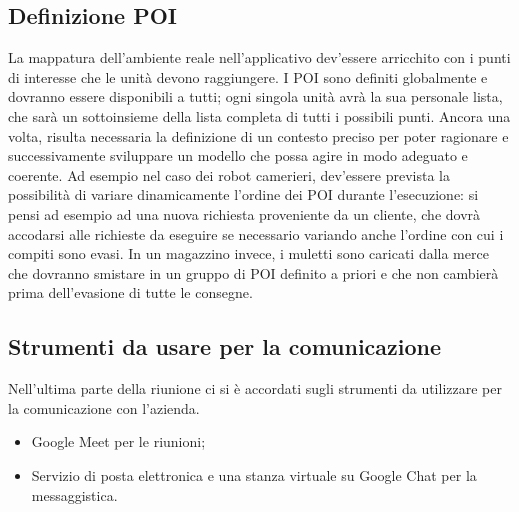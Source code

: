 \subsection{Definizione POI}
La mappatura dell'ambiente reale nell'applicativo dev'essere arricchito con i punti di interesse che le unità devono raggiungere. I POI sono definiti globalmente e dovranno essere disponibili a tutti; ogni singola unità avrà la sua personale lista, che sarà un sottoinsieme della lista completa di tutti i possibili punti.
Ancora una volta, risulta necessaria la definizione di un contesto preciso per poter ragionare e successivamente sviluppare un modello che possa agire in modo adeguato e coerente.
Ad esempio nel caso dei robot camerieri, dev'essere prevista la possibilità di variare dinamicamente l'ordine dei POI durante l'esecuzione: si pensi ad esempio ad una nuova richiesta proveniente da un cliente, che dovrà accodarsi alle richieste da eseguire se necessario variando anche l'ordine con cui i compiti sono evasi. 
In un magazzino invece, i muletti sono caricati dalla merce che dovranno smistare in un gruppo di POI definito a priori e che non cambierà prima dell'evasione di tutte le consegne.


\subsection{Strumenti da usare per la comunicazione}
Nell'ultima parte della riunione ci si è accordati sugli strumenti da utilizzare per la comunicazione con l'azienda. 
\begin{itemize}
	\item Google Meet per le riunioni;
	\item Servizio di posta elettronica e una stanza virtuale su Google Chat per la messaggistica.
\end{itemize}